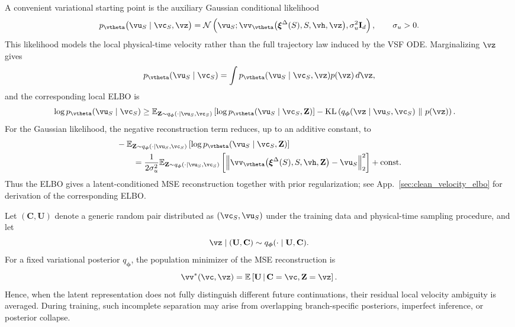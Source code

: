 A convenient variational starting point is the auxiliary Gaussian conditional likelihood
\begin{equation}
p_{\vtheta}
\bigl(
\vu_S
\mid
\vc_S,
\vz
\bigr)
=
\mathcal N
\left(
\vu_S;
\vv_{\vtheta}
\bigl(
\boldsymbol{\xi}^{\Delta}(S),
S,
\vh,
\vz
\bigr),
\sigma_u^2\mathbf{I}_d
\right),
\qquad
\sigma_u>0.
\label{eq:gaussian_velocity_likelihood}
\end{equation}
This likelihood models the local physical-time velocity rather than the full
trajectory law induced by the VSF ODE.  Marginalizing $\vz$ gives
\begin{equation}
p_{\vtheta}
(\vu_S\mid\vc_S)
=
\int
p_{\vtheta}
(\vu_S\mid\vc_S,\vz)
p(\vz)\,d\vz,
\label{eq:vsf_velocity_evidence}
\end{equation}
and the corresponding local ELBO is
\begin{align}
\log
p_{\vtheta}
(\vu_S\mid\vc_S)
\geq{}&
\mathbb E_{
\mathbf{Z}\sim
q_{\boldsymbol{\phi}}
(\cdot\mid\vu_S,\vc_S)
}
\left[
\log
p_{\vtheta}
(\vu_S\mid\vc_S,\mathbf{Z})
\right]
-
\operatorname{KL}
\left(
q_{\boldsymbol{\phi}}
(\vz\mid\vu_S,\vc_S)
\ \Vert \ 
p(\vz)
\right).
\label{eq:vsf_elbo}
\end{align}
For the Gaussian likelihood, the negative reconstruction term reduces, up to
an additive constant, to
\begin{align}
&-
\mathbb E_{
\mathbf{Z}\sim
q_{\boldsymbol{\phi}}
(\cdot\mid\vu_S,\vc_S)
}
\left[
\log
p_{\vtheta}
(\vu_S\mid\vc_S,\mathbf{Z})
\right]
\notag\\
&\qquad=
\frac{1}{2\sigma_u^2}
\mathbb E_{
\mathbf{Z}\sim
q_{\boldsymbol{\phi}}
(\cdot\mid\vu_S,\vc_S)
}
\left[
\left\lVert
\vv_{\vtheta}
\bigl(
\boldsymbol{\xi}^{\Delta}(S),
S,
\vh,
\mathbf{Z}
\bigr)
-
\vu_S
\right\rVert_2^2
\right]
+
\mathrm{const}.
\label{eq:vsf_variational_mse}
\end{align}
Thus the ELBO gives a latent-conditioned MSE reconstruction together
with prior regularization; see App.~\ref{sec:clean_velocity_elbo} for derivation of the corresponding  ELBO.

Let $(\mathbf{C},\mathbf{U})$ denote a generic random pair distributed as
$(\vc_S,\vu_S)$ under the training data and physical-time
sampling procedure, and let
\begin{equation}
\vz\mid(\mathbf{U},\mathbf{C})
\sim
q_{\boldsymbol{\phi}}(\cdot\mid\mathbf{U},\mathbf{C}).
\label{eq:generic_posterior_pair}
\end{equation}
For a fixed variational posterior $q_{\boldsymbol{\phi}}$, the population
minimizer of the MSE reconstruction  is
\begin{equation}
\vv^*(\vc,\vz)
=
\mathbb{E}
\left[
\mathbf{U}
\,\middle|\,
\mathbf{C}=\vc,
\mathbf{Z}=\vz
\right].
\label{eq:generic_mse_conditional_mean}
\end{equation}
Hence, when the latent representation does not fully distinguish different
future continuations, their residual local velocity ambiguity is averaged.
During training, such incomplete separation may arise from
overlapping branch-specific posteriors, imperfect  inference, or
posterior collapse.


